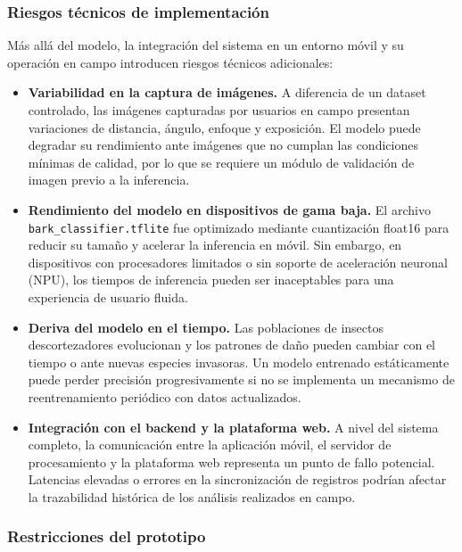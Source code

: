 \subsubsection{Riesgos técnicos de implementación}

Más allá del modelo, la integración del sistema en un entorno móvil y su operación en campo introducen riesgos técnicos adicionales:

\begin{itemize}
    \item \textbf{Variabilidad en la captura de imágenes.} A diferencia de un dataset controlado, las imágenes capturadas por usuarios en campo presentan variaciones de distancia, ángulo, enfoque y exposición. El modelo puede degradar su rendimiento ante imágenes que no cumplan las condiciones mínimas de calidad, por lo que se requiere un módulo de validación de imagen previo a la inferencia.

    \item \textbf{Rendimiento del modelo en dispositivos de gama baja.} El archivo \texttt{bark\_classifier.tflite} fue optimizado mediante cuantización float16 para reducir su tamaño y acelerar la inferencia en móvil. Sin embargo, en dispositivos con procesadores limitados o sin soporte de aceleración neuronal (NPU), los tiempos de inferencia pueden ser inaceptables para una experiencia de usuario fluida.

    \item \textbf{Deriva del modelo en el tiempo.} Las poblaciones de insectos descortezadores evolucionan y los patrones de daño pueden cambiar con el tiempo o ante nuevas especies invasoras. Un modelo entrenado estáticamente puede perder precisión progresivamente si no se implementa un mecanismo de reentrenamiento periódico con datos actualizados.

    \item \textbf{Integración con el backend y la plataforma web.} A nivel del sistema completo, la comunicación entre la aplicación móvil, el servidor de procesamiento y la plataforma web representa un punto de fallo potencial. Latencias elevadas o errores en la sincronización de registros podrían afectar la trazabilidad histórica de los análisis realizados en campo.
\end{itemize}

\subsubsection{Restricciones del prototipo}

